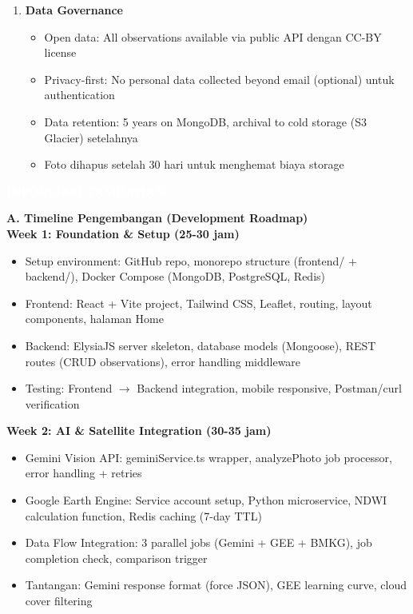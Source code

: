 \documentclass[12pt,a4paper]{article}
\newcommand{\sectionbox}[1]{%
  \colorbox{samsungblue}{%
    \parbox{\textwidth}{%
      \textcolor{white}{\large\bfseries #1}%
    }%
  }%
}
\newcommand{\subsectionbox}[1]{%
  \textbf{\large #1}\\[0.3cm]
}
\begin{document}
\begin{enumerate}
  \item \textbf{Data Governance}
  \begin{itemize}
    \item Open data: All observations available via public API dengan CC-BY license
    \item Privacy-first: No personal data collected beyond email (optional) untuk authentication
    \item Data retention: 5 years on MongoDB, archival to cold storage (S3 Glacier) setelahnya
    \item Foto dihapus setelah 30 hari untuk menghemat biaya storage
  \end{itemize}
\end{enumerate}

\vspace{1cm}

\newpage

\sectionbox{INFORMASI TAMBAHAN}

\vspace{0.5cm}

\subsectionbox{A. Timeline Pengembangan (Development Roadmap)}

\textbf{Week 1: Foundation \& Setup (25-30 jam)}
\begin{itemize}
  \item Setup environment: GitHub repo, monorepo structure (frontend/ + backend/), Docker Compose (MongoDB, PostgreSQL, Redis)
  \item Frontend: React + Vite project, Tailwind CSS, Leaflet, routing, layout components, halaman Home
  \item Backend: ElysiaJS server skeleton, database models (Mongoose), REST routes (CRUD observations), error handling middleware
  \item Testing: Frontend $\rightarrow$ Backend integration, mobile responsive, Postman/curl verification
\end{itemize}

\textbf{Week 2: AI \& Satellite Integration (30-35 jam)}
\begin{itemize}
  \item Gemini Vision API: geminiService.ts wrapper, analyzePhoto job processor, error handling + retries
  \item Google Earth Engine: Service account setup, Python microservice, NDWI calculation function, Redis caching (7-day TTL)
  \item Data Flow Integration: 3 parallel jobs (Gemini + GEE + BMKG), job completion check, comparison trigger
  \item Tantangan: Gemini response format (force JSON), GEE learning curve, cloud cover filtering
\end{itemize}
\end{document}
